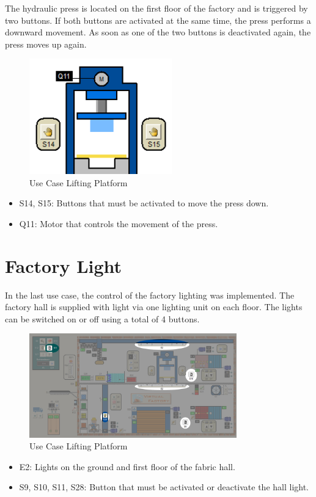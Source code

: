The hydraulic press is located on the first floor of the factory and is triggered by two buttons. If both buttons are activated at the same time, the press performs a downward movement. As soon as one of the two buttons is deactivated again, the press moves up again.

\begin{figure}[h]
    \centering
    \includegraphics[width=0.55\textwidth]{images/usecase_hydraulic_press.png}
    \caption{Use Case Lifting Platform}
    \label{fig:UseCaseHydraulicPress}
\end{figure}

\begin{itemize}
    \item S14, S15: Buttons that must be activated to move the press down.    
    \item Q11: Motor that controls the movement of the press.
\end{itemize}

\newpage
\section{Factory Light}

In the last use case, the control of the factory lighting was implemented. The factory hall is supplied with light via one lighting unit on each floor. The lights can be switched on or off using a total of 4 buttons.

\begin{figure}[h]
    \centering
    \includegraphics[width=0.80\textwidth]{images/usecase_factory_light.png}
    \caption{Use Case Lifting Platform}
    \label{fig:UseCaseFactoryLight}
\end{figure}

\begin{itemize}
    \item E2: Lights on the ground and first floor of the fabric hall.
    \item S9, S10, S11, S28: Button that must be activated or deactivate the hall light.
\end{itemize}

